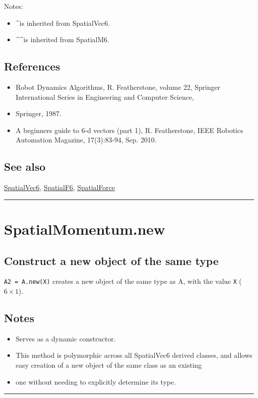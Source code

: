 Notes:

\begin{itemize}
  \item \textasciicircum  is inherited from SpatialVec6.
  \item \textasciicircum\textasciicircum  is inherited from SpatialM6.
\end{itemize}

\subsection*{References}
\begin{itemize}
  \item Robot Dynamics Algorithms, R. Featherstone, volume 22,     Springer International Series in Engineering and Computer Science,
  \item Springer, 1987.
  \item A beginner\textquotesingle s guide to 6-d vectors (part 1), R. Featherstone,     IEEE Robotics Automation Magazine, 17(3):83-94, Sep. 2010.
\end{itemize}

\subsection*{See also}


\hyperlink{SpatialVec6}{\color{blue} SpatialVec6}, \hyperlink{SpatialF6}{\color{blue} SpatialF6}, \hyperlink{SpatialForce}{\color{blue} SpatialForce}

\vspace{1.5ex}\hrule

\hypertarget{SpatialMomentum.new}{\section*{SpatialMomentum.new}}
\subsection*{Construct a new object of the same type}


\texttt{A2 = A.new(X)} creates a new object of the same type as A, with the value
\texttt{X} ($6 \times 1$).


\subsection*{Notes}
\begin{itemize}
  \item Serves as a dynamic constructor.
  \item This method is polymorphic across all SpatialVec6 derived classes, and     allows easy creation of a new object of the same class as an existing
  \item one without needing to explicitly determine its type.
\end{itemize}
\vspace{1.5ex}\rule{\textwidth}{1mm}

